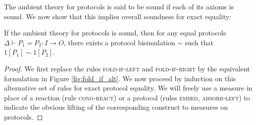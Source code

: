 \noindent The ambient \ipdl theory for protocols is said to be sound if each of its axioms is sound. We now show that this implies overall soundness for exact equality:

\begin{lemma}
If the ambient \ipdl theory for protocols is sound, then for any equal protocols $\Delta \vdash P_1 = P_2 : I \to O$, there exists a protocol bisimulation $\sim$ such that $1[P_1] \sim 1[P_2]$.
\end{lemma}

\begin{proof}
We first replace the rules \textsc{fold-if-left} and \textsc{fold-if-right} by the equivalent formulation in Figure \ref{fig:fold_if_alt}. We now proceed by induction on this alternative set of rules for exact protocol equality. We will freely use a measure in place of a reaction (rule \textsc{cong-react}) or a protocol (rules \textsc{embed}, \textsc{absorb-left}) to indicate the obvious lifting of the corresponding construct to measures on protocols.


\end{proof}
